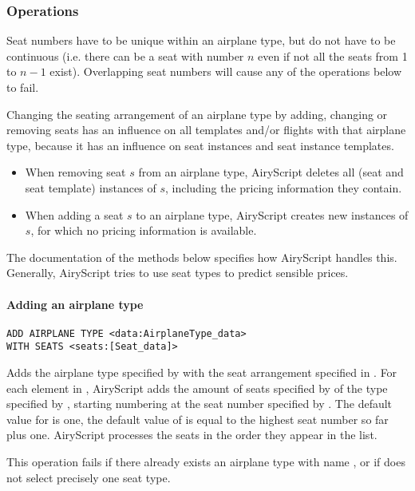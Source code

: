 \subsubsection{Operations}
Seat numbers have to be unique within an airplane type, but do not have to be
continuous (i.e. there can be a seat with number $n$ even if not all the seats
from 1 to $n-1$ exist). Overlapping seat numbers will cause any of the
operations below to fail.

Changing the seating arrangement of an airplane type by adding, changing or
removing seats has an influence on all templates and/or flights with that
airplane type, because it has an influence on seat instances and seat instance
templates.
\begin{itemize}
  \item When removing seat $s$ from an airplane type, AiryScript deletes all
    (seat and seat template) instances of $s$, including the pricing
    information they contain.
  \item When adding a seat $s$ to an airplane type, AiryScript creates new
    instances of $s$, for which no pricing information is available.
\end{itemize}
The documentation of the methods below specifies how AiryScript handles this.
Generally, AiryScript tries to use seat types to predict sensible prices.

\paragraph{Adding an airplane type}
\begin{operation}
  \begin{lstlisting}
ADD AIRPLANE TYPE <data:AirplaneType_data>
WITH SEATS <seats:[Seat_data]>
  \end{lstlisting}
  \label{op:add_airplane_type}
\end{operation}
Adds the airplane type specified by  with the seat arrangement
specified in . For each element in , AiryScript adds
the amount of seats specified by  of the type specified by ,
starting numbering at the seat number specified by .  The default
value for  is one, the default value of  is equal to the
highest seat number so far plus one. AiryScript processes the seats in the order
they appear in the  list.

This operation fails if there already exists an airplane type with name
, or if  does not select precisely one seat type.


